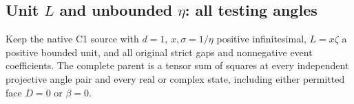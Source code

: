 \subsection{Unit \texorpdfstring{$L$}{L} and unbounded \texorpdfstring{$\eta$}{eta}: all testing angles}
\label{component:pb0d9d28d0849}
\label{component:pda4a21937f64}

\begin{theorem}\label{thm:c1-unit-L-all-tests}
Keep the native C1 source with $d=1$, $x,\sigma=1/\eta$ positive
infinitesimal, $L=x\zeta$ a positive bounded unit, and all original
strict gaps and nonnegative event coefficients. The complete parent
is a tensor sum of squares at every independent projective angle pair
and every real or complex state, including either permitted face
$D=0$ or $\beta=0$.
\end{theorem}
